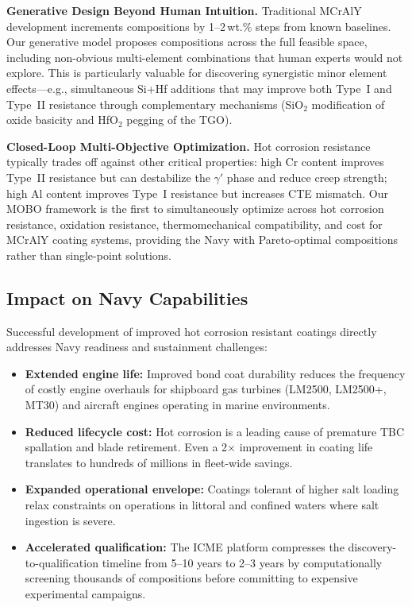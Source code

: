 \documentclass[11pt,letterpaper]{article}
\begin{document}
\textbf{Generative Design Beyond Human Intuition.} Traditional MCrAlY development increments compositions by 1--2\,wt.\% steps from known baselines. Our generative model proposes compositions across the full feasible space, including non-obvious multi-element combinations that human experts would not explore. This is particularly valuable for discovering synergistic minor element effects---e.g., simultaneous Si+Hf additions that may improve both Type~I and Type~II resistance through complementary mechanisms (SiO$_2$ modification of oxide basicity and HfO$_2$ pegging of the TGO).

\textbf{Closed-Loop Multi-Objective Optimization.} Hot corrosion resistance typically trades off against other critical properties: high Cr content improves Type~II resistance but can destabilize the $\gamma'$ phase and reduce creep strength; high Al content improves Type~I resistance but increases CTE mismatch. Our MOBO framework is the first to simultaneously optimize across hot corrosion resistance, oxidation resistance, thermomechanical compatibility, and cost for MCrAlY coating systems, providing the Navy with Pareto-optimal compositions rather than single-point solutions.

\subsection{Impact on Navy Capabilities}

Successful development of improved hot corrosion resistant coatings directly addresses Navy readiness and sustainment challenges:
\begin{itemize}[nosep]
  \item \textbf{Extended engine life:} Improved bond coat durability reduces the frequency of costly engine overhauls for shipboard gas turbines (LM2500, LM2500+, MT30) and aircraft engines operating in marine environments.
  \item \textbf{Reduced lifecycle cost:} Hot corrosion is a leading cause of premature TBC spallation and blade retirement. Even a 2$\times$ improvement in coating life translates to hundreds of millions in fleet-wide savings.
  \item \textbf{Expanded operational envelope:} Coatings tolerant of higher salt loading relax constraints on operations in littoral and confined waters where salt ingestion is severe.
  \item \textbf{Accelerated qualification:} The ICME platform compresses the discovery-to-qualification timeline from 5--10 years to 2--3 years by computationally screening thousands of compositions before committing to expensive experimental campaigns.
\end{itemize}
\end{document}
